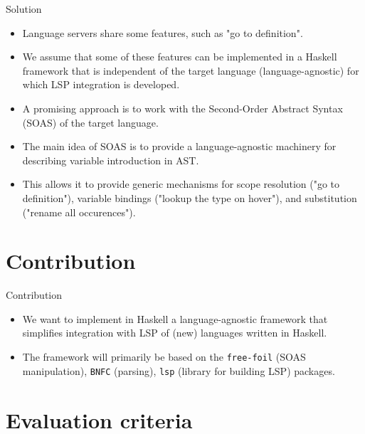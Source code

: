 \documentclass[serif, aspectratio=169]{beamer}
\begin{document}
\begin{frame}{Solution}
    \begin{itemize}
        [<+-| alert+>] %
        \item Language servers share some features, such as "go to definition".
        \item We assume that some of these features can be implemented in a Haskell framework that is independent of the target language (language-agnostic) for which LSP integration is developed.
        \item A promising approach is to work with the Second-Order Abstract Syntax (SOAS) \cite{fiore_formal_2022} of the target language.
        \item The main idea of SOAS is to provide a language-agnostic machinery for describing variable introduction in AST.
        \item This allows it to provide generic mechanisms for scope resolution ("go to definition"), variable bindings ("lookup the type on hover"), and substitution ("rename all occurences").
    \end{itemize}
\end{frame}

\section{Contribution}

\begin{frame}{Contribution}
    \begin{itemize}
        [<+-| alert+>] %
        \item We want to implement in Haskell a language-agnostic framework that simplifies integration with LSP of (new) languages written in Haskell.
        \item The framework will primarily be based on the \texttt{free-foil} \cite{hackage_free_foil} (SOAS manipulation), \texttt{BNFC} \cite{hackage_bnfc} (parsing), \texttt{lsp} \cite{hackage_lsp} (library for building LSP) packages.
    \end{itemize}
\end{frame}

\section{Evaluation criteria}
\label{sec:evaluation_criteria}
\end{document}
